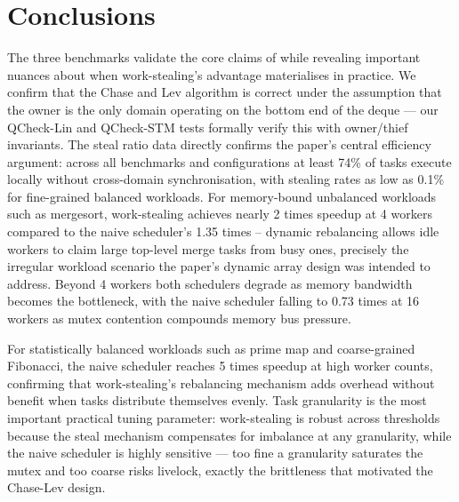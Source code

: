 \documentclass[11pt,a4paper]{article}
\begin{document}
\section{Conclusions}
\label{sec:conclusions}

The three benchmarks validate the core claims of \cite{chase2005dynamic}
while revealing important nuances about when work-stealing's advantage
materialises in practice. We confirm that the Chase and Lev algorithm is correct
under the assumption that the owner is the only domain operating on the bottom
end of the deque — our QCheck-Lin and QCheck-STM tests formally verify this
with owner/thief invariants. The steal ratio data directly confirms the paper's
central efficiency argument: across all benchmarks and configurations at least
74\% of tasks execute locally without cross-domain synchronisation, with
stealing rates as low as 0.1\% for fine-grained balanced workloads. For
memory-bound unbalanced workloads such as mergesort, work-stealing achieves
nearly 2 times speedup at 4 workers compared to the naive scheduler's
1.35 times -- dynamic rebalancing allows idle workers to claim large
top-level merge tasks from busy ones, precisely the irregular
workload scenario the paper's dynamic array design was intended to address.
Beyond 4 workers both schedulers degrade as memory bandwidth becomes the
bottleneck, with the naive scheduler falling to 0.73 times at 16 workers as
mutex contention compounds memory bus pressure.

For statistically balanced workloads such as prime map and coarse-grained Fibonacci,
the naive scheduler reaches 5 times speedup at high worker counts, confirming
that work-stealing's rebalancing mechanism adds overhead without benefit
when tasks distribute themselves evenly. Task granularity is the most important
practical tuning parameter: work-stealing is robust across thresholds because
the steal mechanism compensates for imbalance at any granularity, while the naive
scheduler is highly sensitive — too fine a granularity saturates the mutex and
too coarse risks livelock, exactly the brittleness that motivated the Chase-Lev
design.
\end{document}
